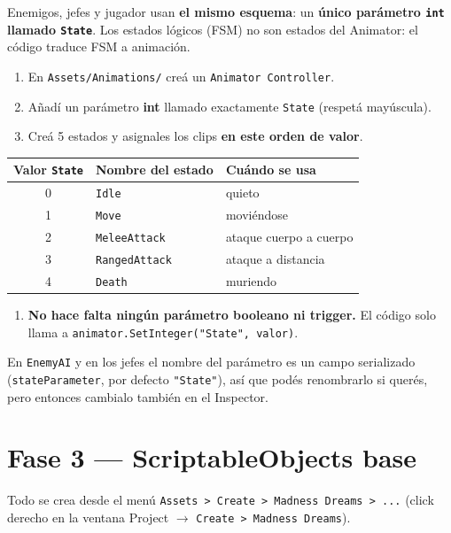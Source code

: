 \documentclass[a4paper,12pt]{article}
\newcommand{\code}[1]{\texttt{#1}}
\begin{document}
Enemigos, jefes y jugador usan \textbf{el mismo esquema}: un \textbf{único parámetro \code{int}
llamado \code{State}}. Los estados lógicos (FSM) no son estados del Animator: el código traduce
FSM a animación.

\begin{enumerate}
    \item En \code{Assets/Animations/} creá un \code{Animator Controller}.
    \item Añadí un parámetro \textbf{int} llamado exactamente \code{State} (respetá mayúscula).
    \item Creá 5 estados y asignales los clips \textbf{en este orden de valor}.
\end{enumerate}

\begin{center}
\begin{tabular}{|c|l|l|}
\hline
\textbf{Valor \code{State}} & \textbf{Nombre del estado} & \textbf{Cuándo se usa} \\
\hline
0 & \code{Idle} & quieto \\
\hline
1 & \code{Move} & moviéndose \\
\hline
2 & \code{MeleeAttack} & ataque cuerpo a cuerpo \\
\hline
3 & \code{RangedAttack} & ataque a distancia \\
\hline
4 & \code{Death} & muriendo \\
\hline
\end{tabular}
\end{center}

\begin{enumerate}[resume]
    \item \textbf{No hace falta ningún parámetro booleano ni trigger.} El código solo llama a
    \code{animator.SetInteger("State", valor)}.
\end{enumerate}

En \code{EnemyAI} y en los jefes el nombre del parámetro es un campo serializado
(\code{stateParameter}, por defecto \code{"State"}), así que podés renombrarlo si querés, pero
entonces cambialo también en el Inspector.

\section{Fase 3 --- ScriptableObjects base}

Todo se crea desde el menú \code{Assets > Create > Madness Dreams > ...} (click derecho en la
ventana Project $\to$ \code{Create > Madness Dreams}).
\end{document}
